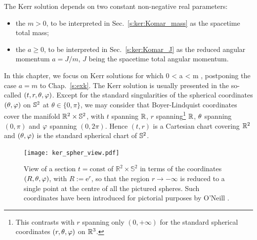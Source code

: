 The Kerr solution depends on two constant non-negative real parameters:
\begin{itemize}
\item the  $m > 0$, to be
interpreted in Sec.~\ref{s:ker:Komar_mass} as the spacetime total mass;
\item the  $a \geq 0 $,
to be interpreted in Sec.~\ref{s:ker:Komar_J} as the reduced angular momentum  $a=J/m$, $J$ being the
spacetime total angular momentum.
\end{itemize}
In this chapter, we focus on Kerr solutions for which
\be \label{e:ker:a_lower_m}
    0 < a < m ,
\ee
postponing the case $a=m$ to Chap.~\ref{s:exk}.
The Kerr solution is usually presented in the so-called
$(t,r,\theta,\varphi)$. Except for the standard singularities of the
spherical coordinates $(\theta,\varphi)$ on $\mathbb{S}^2$ at $\theta\in\{0,\pi\}$,
we may consider that Boyer-Lindquist coordinates cover the manifold
$\mathbb{R}^2\times\mathbb{S}^2$, with $t$ spanning $\mathbb{R}$, $r$
spanning\footnote{This contrasts with $r$ spanning only $(0,+\infty)$ for
the standard spherical coordinates $(r,\theta,\varphi)$ on $\mathbb{R}^3$.} $\mathbb{R}$,
$\theta$ spanning $(0,\pi)$ and $\varphi$ spanning $(0,2\pi)$. Hence
$(t,r)$ is a Cartesian chart covering $\mathbb{R}^2$ and $(\theta,\varphi)$ is the standard
spherical chart of $\mathbb{S}^2$.

\begin{figure}
\centerline{\texttt{[image: ker\_spher\_view.pdf]}}
\caption[]{\label{f:ker:spher_view} \footnotesize
View of a section $t=\mathrm{const}$ of $\mathbb{R}^2\times\mathbb{S}^2$
in terms of the coordinates $(R,\theta,\varphi)$, with $R:=\mathrm{e}^r$,
so that the region $r\rightarrow -\infty$
is reduced to a single point at the centre of all the pictured spheres.
Such coordinates have been introduced for pictorial purposes by O'Neill
\cite{ONeil95}.}
\end{figure}


